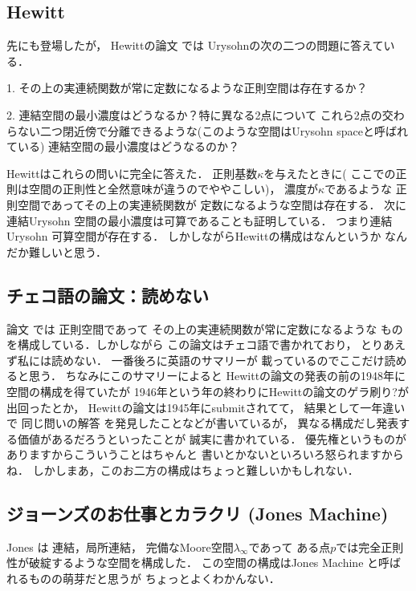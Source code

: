 \documentclass[leqno, a4paper, 12pt]{jsarticle}
\begin{document}
\subsection{Hewitt}
先にも登場したが，
Hewittの論文
\cite{MR0017527}
では
Urysohnの次の二つの問題に答えている．

1. その上の実連続関数が常に定数になるような正則空間は存在するか？

2. 連結空間の最小濃度はどうなるか？特に異なる2点について
これら2点の交わらない二つ閉近傍で分離できるような(このような空間はUrysohn spaceと呼ばれている)
連結空間の最小濃度はどうなるのか？

Hewittはこれらの問いに完全に答えた．
正則基数$\kappa$を与えたときに(
ここでの正則は空間の正則性と全然意味が違うのでややこしい)，
濃度が$\kappa$であるような
正則空間であってその上の実連続関数が
定数になるような空間は存在する．
次に
連結Urysohn 空間の最小濃度は可算であることも証明している．
つまり連結Urysohn 可算空間が存在する．
しかしながらHewittの構成はなんというか
なんだか難しいと思う．

\subsection{チェコ語の論文：読めない}
論文
\cite{novak1948regular}
では
正則空間であって
その上の実連続関数が常に定数になるような
ものを構成している．しかしながら
この論文はチェコ語で書かれており，
とりあえず私には読めない．
一番後ろに英語のサマリーが
載っているのでここだけ読めると思う．
ちなみにこのサマリーによると
Hewittの論文の発表の前の1948年に空間の構成を得ていたが
1946年という年の終わりにHewittの論文のゲラ刷り?が出回ったとか，
Hewittの論文は1945年にsubmitされてて，
結果として一年違いで
同じ問いの解答
を発見したことなどが書いているが，
異なる構成だし発表する価値があるだろうといったことが
誠実に書かれている．
優先権というものがありますからこういうことはちゃんと
書いとかないといろいろ怒られますからね．
しかしまあ，このお二方の構成はちょっと難しいかもしれない．


\subsection{ジョーンズのお仕事とカラクリ (Jones Machine)}
Jones 
\cite{MR0093757}
は
連結，局所連結，
完備なMoore空間$\lambda_{\infty}$であって
ある点$p$では完全正則性が破綻するような空間を構成した．
この空間の構成はJones Machine
と呼ばれるものの萌芽だと思うが
ちょっとよくわかんない．
\end{document}
